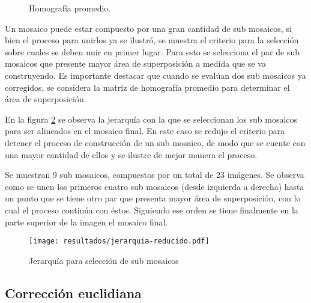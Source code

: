 \begin{figure}[h]
	\centering     %
	\hspace{1mm}%
	\hspace{1mm}%
	
	\caption[Homografía promedio: \textit{ScottReef 25}]{Homografía promedio. }
	\label{imagen:avgh:SR}
\end{figure}

Un mosaico puede estar compuesto por una gran cantidad de sub mosaicos, si bien el proceso para unirlos ya se ilustró, se muestra el criterio para la selección sobre cuales se deben unir en primer lugar. Para esto se selecciona el par de sub mosaicos que presente mayor área de superposición a medida que se va construyendo. Es importante destacar que cuando se evalúan dos sub mosaicos ya corregidos, se considera la matriz de homografía promedio para determinar el área de superposición.

En la figura \ref{imagen:jerarquia0234} se observa la jerarquía con la que se seleccionan los sub mosaicos para ser alineados en el mosaico final. En este caso se redujo el criterio para detener el proceso de construcción de un sub mosaico, de modo que se cuente con una mayor cantidad de ellos y se ilustre de mejor manera el proceso.

Se muestran 9 sub mosaicos, compuestos por un total de  23 imágenes. Se observa como se unen los primeros cuatro sub mosaicos (desde izquierda a derecha) hasta un punto que se tiene otro par que presenta mayor área de superposición, con lo cual el proceso continúa con éstos. Siguiendo ese orden se tiene finalmente en la parte superior de la imagen el mosaico final.

\begin{figure}[H]
	\centering
	\texttt{[image: resultados/jerarquia-reducido.pdf]}
	\caption[Selección de sub mosaicos]{Jerarquía para selección de sub mosaicos}
	\label{imagen:jerarquia0234}
\end{figure}



\subsection*{Corrección euclidiana}


